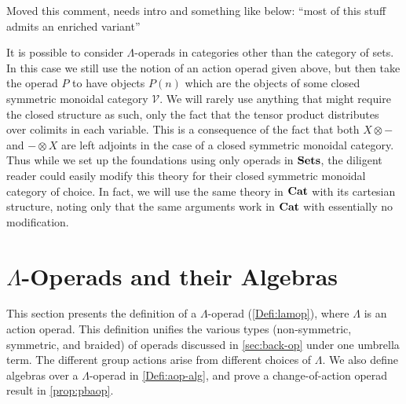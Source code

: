 \label{part:op-with-eq}

Moved this comment, needs intro and something like below: ``most of this stuff admits an enriched variant''
\begin{rem}
It is possible to consider $\Lambda$-operads in categories other than the category of sets. In this case we still use the notion of an action operad given above, but then take the operad $P$ to have objects $P(n)$ which are the objects of some closed symmetric monoidal category $\mathcal{V}$. We will rarely use anything that might require the closed structure as such, only the fact that the tensor product distributes over colimits in each variable. This is a consequence of the fact that both $X \otimes -$ and $- \otimes X$ are left adjoints in the case of a closed symmetric monoidal category. Thus while we set up the foundations using only operads in $\mathbf{Sets}$, the diligent reader could easily modify this theory for their closed symmetric monoidal category of choice. In fact, we will use the same theory in $\mathbf{Cat}$ with its cartesian structure, noting only that the same arguments work in $\mathbf{Cat}$ with essentially no modification.
\end{rem}


\section{\texorpdfstring{$\Lambda$}{L}-Operads and their Algebras}

This section presents the definition of a $\Lambda$-operad (\cref{Defi:lamop}), where $\Lambda$ is an action operad.
This definition unifies the various types (non-symmetric, symmetric, and braided) of operads discussed in \cref{sec:back-op} under one umbrella term.
The different group actions arise from different choices of $\Lambda$.
We also define algebras over a $\Lambda$-operad in \cref{Defi:aop-alg}, and prove a change-of-action operad result in \cref{prop:pbaop}.

